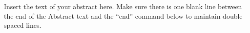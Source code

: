 \documentclass[12pt,letterpaper]{lsuetd}
\begin{document}

\singlespacing
\tableofcontents
\pagebreak

\renewcommand\@pnumwidth{1.55em}
\renewcommand\@tocrmarg{8.55em}
\listoftables
\pagebreak
\listoffigures
\pagebreak


\renewenvironment{abstract}{{\hspace{-2.2em} \huge \textbf{\abstractname}} \par}{\pagebreak}
\begin{abstract}
\vspace{0.55ex}
\doublespacing
Insert the text of your abstract here.  Make sure there is one blank line between the end of the Abstract text and the ``end'' command below to maintain double--spaced lines.

\end{abstract}
\end{document}
